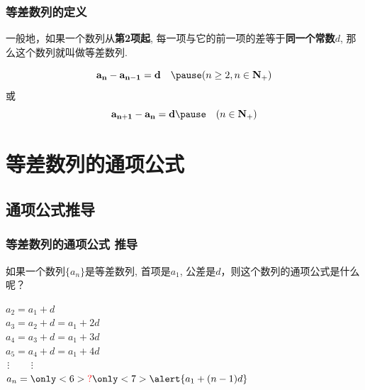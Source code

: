 \documentclass[12pt]{beamer}
\begin{document}
		\begin{frame}\frametitle{等差数列的定义}
		    
			一般地，如果一个数列从\pause \alert{\textbf{第2项起}}, \pause 每一项与它的前一项的差等于\pause \alert{\textbf{同一个常数$d$}}, \pause 那么这个数列就叫做等差数列. 
			\pause

			\begin{large}
				\[ \mathbf{a_n-a_{n-1}=d}\quad \pause (n\geq 2, n\in \mathbf{N_+} ) \] \pause 或
				\[ \mathbf{a_{n+1}-a_n=d}  \pause \quad (n\in \mathbf{N_+}) \]
			\end{large}
			
		\end{frame}


\section{等差数列的通项公式}
	\subsection{通项公式推导}

		    
		

		\begin{frame}\frametitle{等差数列的通项公式 推导}
		    
			如果一个数列$\{a_n\}$是等差数列, 首项是$a_1$, 公差是$d$，则这个数列的通项公式是什么呢？\pause

				$a_2=a_1+d$\\ \pause
				$a_3=a_2+d=a_1+2d$\\ \pause
				$a_4=a_3+d=a_1+3d$\\ \pause
				$a_5=a_4+d=a_1+4d$\\ \pause
				$\hspace{2pt}\vdots \hspace{26pt} \vdots$\\
				$a_n=\only<6>{\color{red}?} \only<7>{\alert{a_1+(n-1)d}}$
			
		\end{frame}
\end{document}
